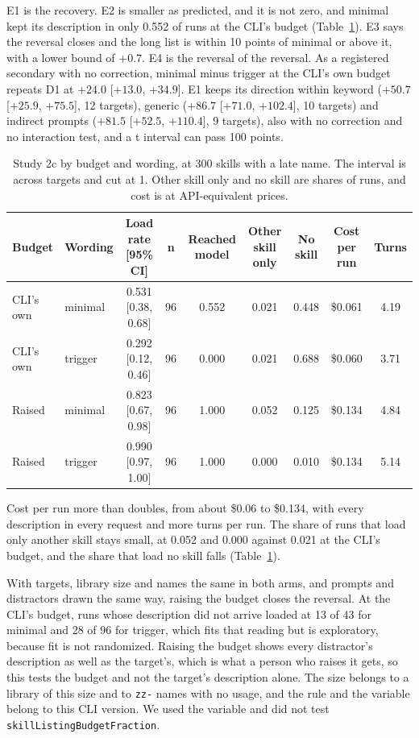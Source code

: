 \documentclass[10pt]{article}
\makeatletter
\newcommand{\code}[1]{\texttt{#1}}
\newcommand{\ci}[3]{$#1$ [$#2$, $#3$]}
\renewcommand\paragraph{\@startsection{paragraph}{4}{\z@}{.7ex plus .2ex minus .1ex}{-1em}{\normalfont\normalsize\bfseries}}
\makeatother
\begin{document}
E1 is the recovery. E2 is smaller as predicted, and it is not zero, and minimal kept its description in only 0.552 of runs at the CLI's budget (Table~\ref{tab:grid2c}). E3 says the reversal closes and the long list is within 10 points of minimal or above it, with a lower bound of $+0.7$. E4 is the reversal of the reversal. As a registered secondary with no correction, minimal minus trigger at the CLI's own budget repeats D1 at \ci{+24.0}{+13.0}{+34.9}. E1 keeps its direction within keyword (\ci{+50.7}{+25.9}{+75.5}, 12 targets), generic (\ci{+86.7}{+71.0}{+102.4}, 10 targets) and indirect prompts (\ci{+81.5}{+52.5}{+110.4}, 9 targets), also with no correction and no interaction test, and a t interval can pass 100 points.

\begin{table}[t]\centering\footnotesize
\caption{Study 2c by budget and wording, at 300 skills with a late name. The interval is across targets and cut at 1. Other skill only and no skill are shares of runs, and cost is at API-equivalent prices.}\label{tab:grid2c}
\begin{tabular}{llccccccc}\toprule
Budget & Wording & Load rate [95\% CI] & n & Reached model & Other skill only & No skill & Cost per run & Turns\\\midrule
CLI's own & minimal & 0.531 [0.38, 0.68] & 96 & 0.552 & 0.021 & 0.448 & \$0.061 & 4.19\\
CLI's own & trigger & 0.292 [0.12, 0.46] & 96 & 0.000 & 0.021 & 0.688 & \$0.060 & 3.71\\
Raised & minimal & 0.823 [0.67, 0.98] & 96 & 1.000 & 0.052 & 0.125 & \$0.134 & 4.84\\
Raised & trigger & 0.990 [0.97, 1.00] & 96 & 1.000 & 0.000 & 0.010 & \$0.134 & 5.14\\\bottomrule
\end{tabular}
\end{table}

Cost per run more than doubles, from about \$0.06 to \$0.134, with every description in every request and more turns per run. The share of runs that load only another skill stays small, at 0.052 and 0.000 against 0.021 at the CLI's budget, and the share that load no skill falls (Table~\ref{tab:grid2c}).

\paragraph{What this shows and does not.} With targets, library size and names the same in both arms, and prompts and distractors drawn the same way, raising the budget closes the reversal. At the CLI's budget, runs whose description did not arrive loaded at 13 of 43 for minimal and 28 of 96 for trigger, which fits that reading but is exploratory, because fit is not randomized. Raising the budget shows every distractor's description as well as the target's, which is what a person who raises it gets, so this tests the budget and not the target's description alone. The size belongs to a library of this size and to \code{zz-} names with no usage, and the rule and the variable belong to this CLI version. We used the variable and did not test \code{skillListingBudgetFraction}.
\end{document}
